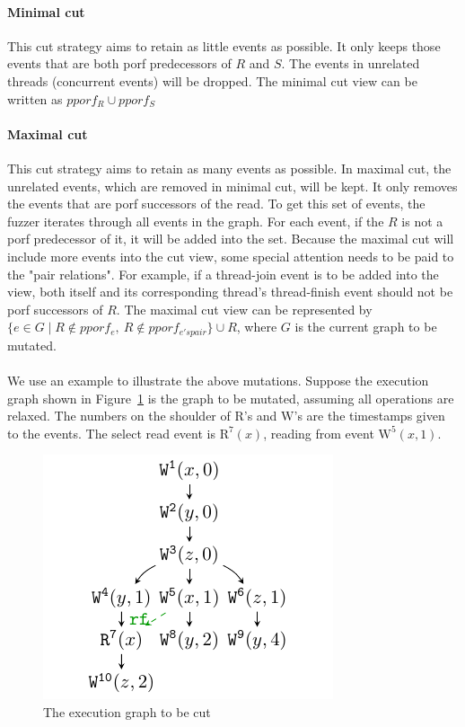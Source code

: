 
\paragraph{Minimal cut} This cut strategy aims to retain as little events as possible. It only keeps those events that are both porf predecessors of $R$ and $S$. The events in unrelated threads (concurrent events) will be dropped. The minimal cut view can be written as $pporf_{R} \cup pporf_{S}$

\paragraph{Maximal cut} This cut strategy aims to retain as many events as possible. In maximal cut, the unrelated events, which are removed in minimal cut, will be kept. It only removes the events that are porf successors of the read. To get this set of events, the fuzzer iterates through all events in the graph. For each event, if the $R$ is not a porf predecessor of it, it will be added into the set. Because the maximal cut will include more events into the cut view, some special attention needs to be paid to the "pair relations". For example, if a thread-join event is to be added into the view, both itself and its corresponding thread's thread-finish event should not be porf successors of $R$. The maximal cut view can be represented by $\{e \in G \mid R \notin pporf_e, \  R \notin pporf_{e's pair}\} \cup {R}$, where $G$ is the current graph to be mutated.



\paragraph{}We use an example to illustrate the above mutations. Suppose the execution graph shown in Figure~\ref{cut:to-be-cut} is the graph to be mutated, assuming all operations are relaxed. The numbers on the shoulder of $\text{R}$'s and $\text{W}$'s are the timestamps given to the events. The select read event is $\text{R}^7(x)$, reading from event $\text{W}^5(x, 1)$.

\begin{figure}[htbp]
	\centering
	\includegraphics[scale=1]{figure/cuts/cut.pdf}
	\caption{The execution graph to be cut}
	\label{cut:to-be-cut}
\end{figure}

